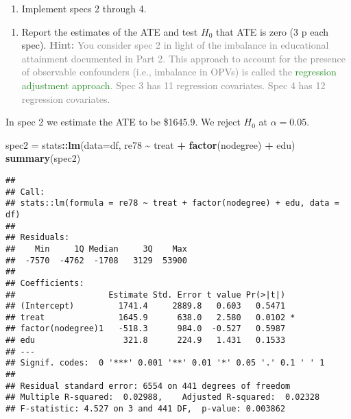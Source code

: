 \documentclass[
]{article}
\newenvironment{Shaded}{\begin{snugshade}}{\end{snugshade}}
\newcommand{\AttributeTok}[1]{\textcolor[rgb]{0.13,0.29,0.53}{#1}}
\newcommand{\FunctionTok}[1]{\textcolor[rgb]{0.13,0.29,0.53}{\textbf{#1}}}
\newcommand{\NormalTok}[1]{#1}
\newcommand{\OtherTok}[1]{\textcolor[rgb]{0.56,0.35,0.01}{#1}}
\newcommand{\SpecialCharTok}[1]{\textcolor[rgb]{0.81,0.36,0.00}{\textbf{#1}}}
\providecommand{\tightlist}{%
  \setlength{\itemsep}{0pt}\setlength{\parskip}{0pt}}
\begin{document}
\begin{enumerate}
\def\labelenumi{\arabic{enumi}.}
\setcounter{enumi}{1}
\tightlist
\item
  Implement specs 2 through 4.
\end{enumerate}

\begin{enumerate}
\def\labelenumi{\alph{enumi}.}
\tightlist
\item
  Report the estimates of the ATE and test \(H_0\) that ATE is zero (3 p
  each spec).
  \textcolor{gray}{\textbf{Hint:} You consider spec 2 in light of the imbalance in educational attainment documented in Part 2. This approach to account for the presence of observable confounders (i.e., imbalance in OPVs) is called the \textcolor{ForestGreen}{regression adjustment approach}. Spec 3 has 11 regression covariates. Spec 4 has 12 regression covariates.}
\end{enumerate}

In spec 2 we estimate the ATE to be \$1645.9. We reject \(H_0\) at
\(\alpha = 0.05\).

\begin{Shaded}
\begin{Highlighting}[]
\NormalTok{spec2 }\OtherTok{=}\NormalTok{ stats}\SpecialCharTok{::}\FunctionTok{lm}\NormalTok{(}\AttributeTok{data=}\NormalTok{df, re78 }\SpecialCharTok{\textasciitilde{}}\NormalTok{ treat }\SpecialCharTok{+} \FunctionTok{factor}\NormalTok{(nodegree) }\SpecialCharTok{+}\NormalTok{ edu)}
\FunctionTok{summary}\NormalTok{(spec2)}
\end{Highlighting}
\end{Shaded}

\begin{verbatim}
## 
## Call:
## stats::lm(formula = re78 ~ treat + factor(nodegree) + edu, data = df)
## 
## Residuals:
##    Min     1Q Median     3Q    Max 
##  -7570  -4762  -1708   3129  53900 
## 
## Coefficients:
##                   Estimate Std. Error t value Pr(>|t|)  
## (Intercept)         1741.4     2889.8   0.603   0.5471  
## treat               1645.9      638.0   2.580   0.0102 *
## factor(nodegree)1   -518.3      984.0  -0.527   0.5987  
## edu                  321.8      224.9   1.431   0.1533  
## ---
## Signif. codes:  0 '***' 0.001 '**' 0.01 '*' 0.05 '.' 0.1 ' ' 1
## 
## Residual standard error: 6554 on 441 degrees of freedom
## Multiple R-squared:  0.02988,    Adjusted R-squared:  0.02328 
## F-statistic: 4.527 on 3 and 441 DF,  p-value: 0.003862
\end{verbatim}
\end{document}
